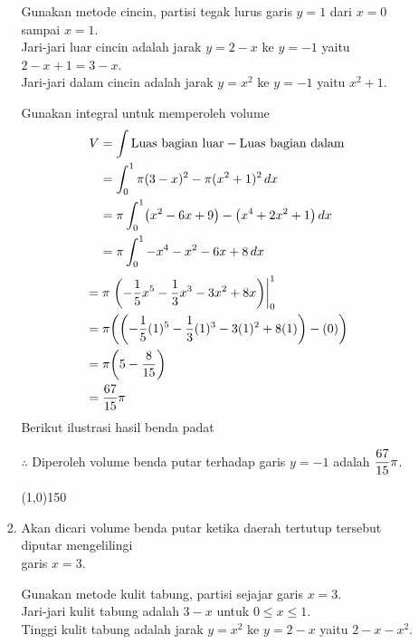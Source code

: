 \begin{enumerate}[leftmargin=*, label={\arabic*}.]
\begin{enumerate}[label={\alph*}.]
\begin{enumerate}[label={\roman*}.]
        Gunakan metode cincin, partisi tegak lurus garis $y=1$ dari $x=0$ 
        sampai $x=1$.\\
        Jari-jari luar cincin adalah jarak $y=2-x$ ke $y=-1$ yaitu $2-x+1=3-x$.\\
        Jari-jari dalam cincin adalah jarak $y=x^2$ ke $y=-1$ yaitu $x^{2}+1$.

        Gunakan integral untuk memperoleh volume
        \begin{align*}
            V &= \int \text{Luas bagian luar} - \text{Luas bagian dalam}\\
            &=\int_{0}^{1} \pi(3-x)^2 - \pi(x^{2}+1)^{2}\,dx \\
            &=\pi\int_{0}^{1} \brk*{x^{2}-6x+9} - \brk*{x^{4}+2x^{2}+1}\,dx \\
            &=\pi\int_{0}^{1} -x^{4}-x^{2}-6x+8\,dx \\
        \end{align*}
        \begin{align*}
            &=\pi\eval{-\frac{1}{5}x^{5}-\frac{1}{3}x^{3}-3x^{2}+8x}{0}{1}\\
            &=\pi\brk*{\brk*{-\frac{1}{5}(1)^{5}
            -\frac{1}{3}(1)^{3}-3(1)^{2}+8(1)}-(0)}\\
            &=\pi\brk*{5-\frac{8}{15}}\\
            &=\frac{67}{15}\pi
        \end{align*}
        Berikut ilustrasi hasil benda padat
        
        

        $\therefore$ Diperoleh volume benda putar terhadap garis 
        $y=-1$ adalah $\displaystyle\frac{67}{15}\pi$.


\begin{center}\line(1,0){150}\end{center}


        \item Akan dicari volume benda putar ketika daerah tertutup tersebut 
        diputar mengelilingi \\garis $x=3$.

        Gunakan metode kulit tabung, partisi sejajar garis $x=3$.\\
        Jari-jari kulit tabung adalah $3-x$ untuk $0 \leq x \leq 1$.\\
        Tinggi kulit tabung adalah jarak $y=x^{2}$ ke $y=2-x$ yaitu $2-x-x^{2}$.


\end{enumerate}
\end{enumerate}
\end{enumerate}
